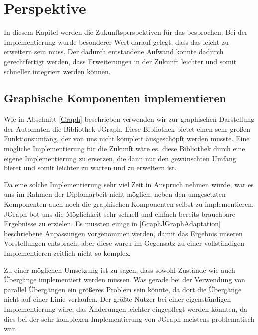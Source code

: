 

\chapter{Perspektive}\label{Perspective}

In diesem Kapitel werden die Zukunftsperspektiven für das \gtitool besprochen.
Bei der Implementierung wurde besonderer Wert darauf gelegt, dass das \gtitool
leicht zu erweitern sein muss. Der dadurch entstandene Aufwand konnte dadurch
gerechtfertigt werden, dass Erweiterungen in der Zukunft leichter und somit
schneller integriert werden können.


\section{Graphische Komponenten implementieren}\label{PerspectiveGraphics}

Wie in Abschnitt \ref{Graph} beschrieben verwenden wir zur graphischen
Darstellung der Automaten die Bibliothek JGraph. Diese Bibliothek bietet einen
sehr großen Funktionsumfang, der von uns nicht komplett ausgeschöpft werden
musste. Eine mögliche Implementierung für die Zukunft wäre es, diese Bibliothek
durch eine eigene Implementierung zu ersetzen, die dann nur den gewünschten
Umfang bietet und somit leichter zu warten und zu erweitern ist.\vspace{10pt}

Da eine solche Implementierung sehr viel Zeit in Anspruch nehmen würde, war es
uns im Rahmen der Diplomarbeit nicht möglich, neben den umgesetzten Komponenten
auch noch die graphischen Komponenten selbst zu implementieren. JGraph bot uns
die Möglichkeit sehr schnell und einfach bereits brauchbare Ergebnisse zu
erzielen. Es mussten einige in \ref{GraphJGraphAdaptation} beschriebene
Anpassungen vorgenommen werden, damit das Ergebnis unseren Vorstellungen
entsprach, aber diese waren im Gegensatz zu einer vollständigen Implementieren
zeitlich nicht so komplex.\vspace{10pt}

Zu einer möglichen Umsetzung ist zu sagen, dass sowohl Zustände wie auch
Übergänge implementiert werden müssen. Was gerade bei der Verwendung von parallel
Übergängen ein größeres Problem sein könnte, da dort die Übergänge nicht auf
einer Linie verlaufen. Der größte Nutzer bei einer eigenständigen Implementierung
wäre, das Änderungen leichter eingepflegt werden könnten, da dies bei der sehr
komplexen Implementierung von JGraph meistens problematisch war.


